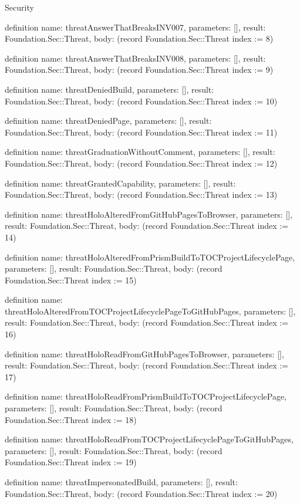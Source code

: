 \begin{lexlean}{Security}
\begin{semanticmodule}
definition{
  name: threatAnswerThatBreaksINV007,
  parameters: [],
  result: Foundation.Sec::Threat,
  body: (record Foundation.Sec::Threat {index := 8})
}

definition{
  name: threatAnswerThatBreaksINV008,
  parameters: [],
  result: Foundation.Sec::Threat,
  body: (record Foundation.Sec::Threat {index := 9})
}

definition{
  name: threatDeniedBuild,
  parameters: [],
  result: Foundation.Sec::Threat,
  body: (record Foundation.Sec::Threat {index := 10})
}

definition{
  name: threatDeniedPage,
  parameters: [],
  result: Foundation.Sec::Threat,
  body: (record Foundation.Sec::Threat {index := 11})
}

definition{
  name: threatGraduationWithoutComment,
  parameters: [],
  result: Foundation.Sec::Threat,
  body: (record Foundation.Sec::Threat {index := 12})
}

definition{
  name: threatGrantedCapability,
  parameters: [],
  result: Foundation.Sec::Threat,
  body: (record Foundation.Sec::Threat {index := 13})
}

definition{
  name: threatHoloAlteredFromGitHubPagesToBrowser,
  parameters: [],
  result: Foundation.Sec::Threat,
  body: (record Foundation.Sec::Threat {index := 14})
}

definition{
  name: threatHoloAlteredFromPrismBuildToTOCProjectLifecyclePage,
  parameters: [],
  result: Foundation.Sec::Threat,
  body: (record Foundation.Sec::Threat {index := 15})
}

definition{
  name: threatHoloAlteredFromTOCProjectLifecyclePageToGitHubPages,
  parameters: [],
  result: Foundation.Sec::Threat,
  body: (record Foundation.Sec::Threat {index := 16})
}

definition{
  name: threatHoloReadFromGitHubPagesToBrowser,
  parameters: [],
  result: Foundation.Sec::Threat,
  body: (record Foundation.Sec::Threat {index := 17})
}

definition{
  name: threatHoloReadFromPrismBuildToTOCProjectLifecyclePage,
  parameters: [],
  result: Foundation.Sec::Threat,
  body: (record Foundation.Sec::Threat {index := 18})
}

definition{
  name: threatHoloReadFromTOCProjectLifecyclePageToGitHubPages,
  parameters: [],
  result: Foundation.Sec::Threat,
  body: (record Foundation.Sec::Threat {index := 19})
}

definition{
  name: threatImpersonatedBuild,
  parameters: [],
  result: Foundation.Sec::Threat,
  body: (record Foundation.Sec::Threat {index := 20})
}


\end{semanticmodule}
\end{lexlean}
